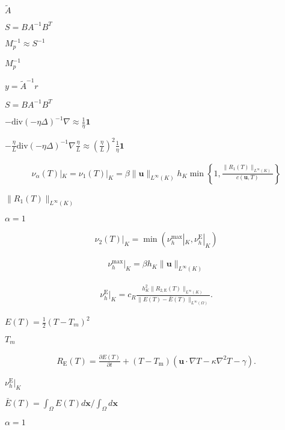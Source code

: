 \documentclass{article}
\begin{document}
$\tilde{A}$
\pagebreak

$S = B A^{-1} B^T$
\pagebreak

$M_p^{-1}\approx S^{-1}$
\pagebreak

$M_p^{-1}$
\pagebreak

$y = \tilde A^{-1} r$
\pagebreak

$S=B A^{-1} B^T$
\pagebreak

$-\text{div}(-\eta\Delta)^{-1}\nabla \approx \frac 1{\eta} \mathbf{1}$
\pagebreak

$-\frac{\eta}{L}\text{div}(-\eta\Delta)^{-1}\nabla \frac{\eta}{L} \approx \left(\frac{\eta}{L}\right)^2 \frac 1{\eta} \mathbf{1}$
\pagebreak

\begin{eqnarray*} \nu_\alpha(T)|_K = \nu_1(T)|_K = \beta \|\mathbf{u}\|_{L^\infty(K)} h_K \min\left\{ 1, \frac{\|R_1(T)\|_{L^\infty(K)}}{c(\mathbf{u},T)} \right\} \end{eqnarray*}
\pagebreak

$\|R_1(T)\|_{L^\infty(K)}$
\pagebreak

$\alpha = 1$
\pagebreak

\begin{eqnarray*} \nu_2(T)|_K = \min (\nu_h^\mathrm{max}|_K,\nu_h^\mathrm{E}|_K) \end{eqnarray*}
\pagebreak

\begin{eqnarray*} \nu^\mathrm{max}_h|_K = \beta h_K \|\mathbf {u}\|_{L^\infty(K)} \end{eqnarray*}
\pagebreak

\begin{eqnarray*} \nu^\mathrm{E}_h|_K = c_R \frac{h_K^2 \|R_\mathrm{2,E}(T)\|_{L^\infty(K)}} {\|E(T) - \bar{E}(T)\|_{L^\infty(\Omega)} }. \end{eqnarray*}
\pagebreak

$E(T) = \frac12 (T-T_m)^2$
\pagebreak

$T_m$
\pagebreak

\begin{eqnarray*} R_\mathrm{E}(T) = \frac{\partial E(T)}{\partial t} + (T-T_\mathrm{m}) \left(\mathbf{u} \cdot \nabla T - \kappa \nabla^2 T - \gamma\right). \end{eqnarray*}
\pagebreak

$\nu^\mathrm{E}_h|_K$
\pagebreak

$\bar{E}(T) = \int_\Omega E(T) d\mathbf{x}/\int_\Omega d\mathbf{x}$
\pagebreak

$\alpha =1$
\pagebreak
\end{document}
